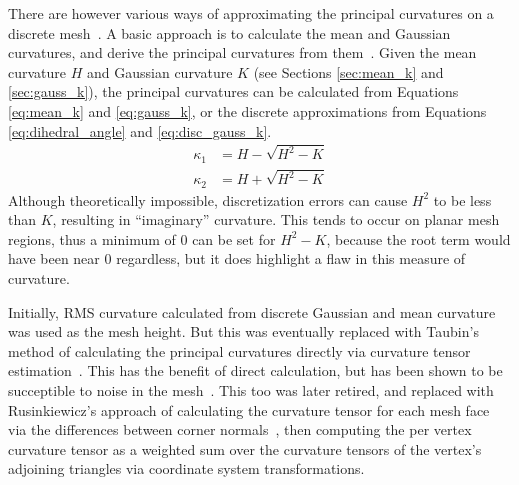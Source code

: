 There are however various ways of approximating the principal curvatures on a discrete mesh~\cite{EstCurvOnTriMesh, DiscDiffGeoOpsTriMani}.
A basic approach is to calculate the mean and Gaussian curvatures, and derive the principal curvatures from them~\cite{DDGAppIntro_19_discrete_k_2, Gauss_mean_k_notes}.
Given the mean curvature $H$ and Gaussian curvature $K$ (see Sections \ref{sec:mean_k} and \ref{sec:gauss_k}), the principal curvatures can be calculated from Equations \ref{eq:mean_k} and \ref{eq:gauss_k}, or the discrete approximations from Equations \ref{eq:dihedral_angle} and \ref{eq:disc_gauss_k}.
\begin{align*}
	\kappa_1 &= H - \sqrt{H^2 - K} \\
	\kappa_2 &= H + \sqrt{H^2 - K}
\end{align*}
Although theoretically impossible, discretization errors can cause $H^2$ to be less than $K$, resulting in ``imaginary'' curvature.
This tends to occur on planar mesh regions, thus a minimum of 0 can be set for $H^2 - K$, because the root term would have been near 0 regardless, but it does highlight a flaw in this measure of curvature.

Initially, RMS curvature calculated from discrete Gaussian and mean curvature was used as the mesh height.
But this was eventually replaced with Taubin's method of calculating the principal curvatures directly via curvature tensor estimation~\cite{TaubinTensor}.
This has the benefit of direct calculation, but has been shown to be succeptible to noise in the mesh~\cite{Comp_k_notes}.
This too was later retired, and replaced with Rusinkiewicz's approach of calculating the curvature tensor for each mesh face via the differences between corner normals~\cite{SRTensor}, then computing the per vertex curvature tensor as a weighted sum over the curvature tensors of the vertex's adjoining triangles via coordinate system transformations.

